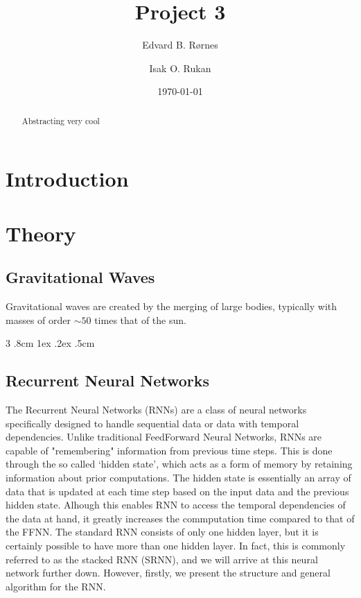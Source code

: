 \documentclass[%
reprint,
amsmath,amssymb,
aps,
]{revtex4-2}
\makeatletter
\renewcommand{\subsubsection}{%
	\@startsection
	{subsubsection}%
	{3}%
	{\z@}%
	{.8cm \@plus1ex \@minus .2ex}%
	{.5cm}%
	{\normalfont\small\centering}%
}
\makeatother
\begin{document}
	
\title{Project 3}
\author{Edvard B. Rørnes}
\author{Isak O. Rukan}
\date{\today}

\begin{abstract}
	Abstracting very cool
\end{abstract}

\maketitle
\tableofcontents

\section{Introduction}


\section{Theory}
\subsection{Gravitational Waves}
Gravitational waves are created by the merging of large bodies, typically with masses of order \(\sim 50\) times that of the sun. 
\subsubsection{}

\subsection{Recurrent Neural Networks}
The Recurrent Neural Networks (RNNs) are a class of neural networks specifically designed to handle sequential data or data with temporal dependencies. Unlike traditional FeedForward Neural Networks, RNNs are capable of "remembering" information from previous time steps. This is done through the so called `hidden state', which acts as a form of memory by retaining information about prior computations. The hidden state is essentially an array of data that is updated at each time step based on the input data and the previous hidden state. Alhough this enables RNN to access the temporal dependencies of the data at hand, it greatly increases the commputation time compared to that of the FFNN. The standard RNN consists of only one hidden layer, but it is certainly possible to have more than one hidden layer. In fact, this is commonly referred to as the stacked RNN (SRNN), and we will arrive at this neural network further down. However, firstly, we present the structure and general algorithm for the RNN.
\end{document}
